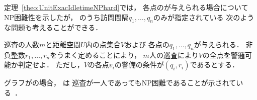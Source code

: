 




定理~\ref{theo:UnitExacIdletimeNPhard}では，
各点の{\exactIdletime}が与えられる場合についてNP困難性を示したが，
{\exactIdletime}のうち訪問間隔$q_1, \ldots, q_n$のみが指定されている
次のような問題も考えることができる．

\begin{intervalSpecifiedPatrollingProblemDecision}
  巡査の人数$m$と距離空間$U$内の点集合$V$および
  各点の{\exactInterval}$q_1, \ldots, q_n$が与えられる．
  非負整数$r_1, \ldots, r_n$をうまく定めることにより，
  $m$人の巡査により$V$の全点を警邏可能か判定せよ．
  ただし，$V$の各点$v_i$の警備の条件が{\exactIdletime}$(q_i, r_i)$であるとする．
\end{intervalSpecifiedPatrollingProblemDecision}

グラフが{\graphUnit}の場合，
{\intervalSpecifiedPatProbDecision}は
巡査が一人であってもNP困難であることが示されている~\cite{kawamura2015simple}．




